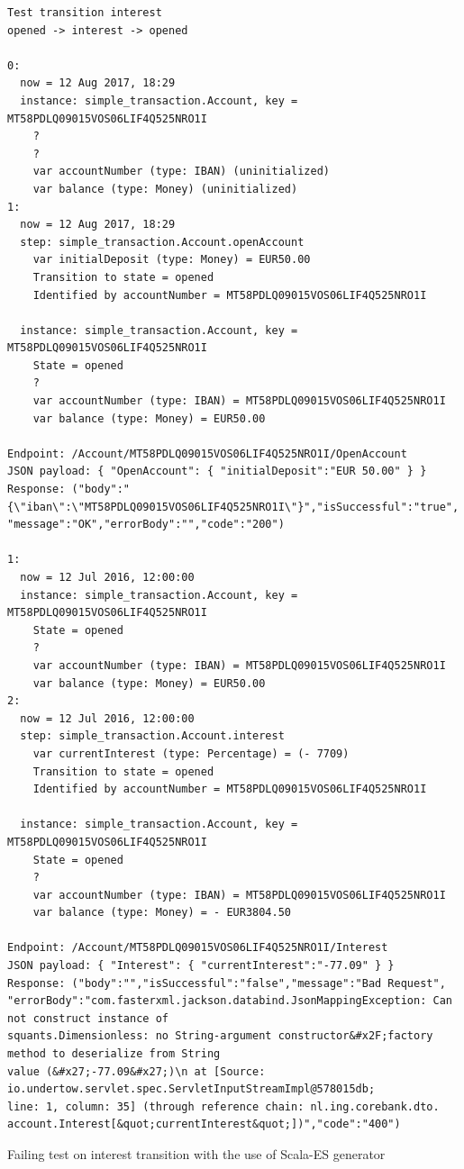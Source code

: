 \begin{sourcecode}[h!]
\begin{lstlisting}[]
Test transition interest
opened -> interest -> opened

0:
  now = 12 Aug 2017, 18:29
  instance: simple_transaction.Account, key = MT58PDLQ09015VOS06LIF4Q525NRO1I
    ?
    ?
    var accountNumber (type: IBAN) (uninitialized)
    var balance (type: Money) (uninitialized)
1:
  now = 12 Aug 2017, 18:29
  step: simple_transaction.Account.openAccount
    var initialDeposit (type: Money) = EUR50.00
    Transition to state = opened
    Identified by accountNumber = MT58PDLQ09015VOS06LIF4Q525NRO1I

  instance: simple_transaction.Account, key = MT58PDLQ09015VOS06LIF4Q525NRO1I
    State = opened
    ?
    var accountNumber (type: IBAN) = MT58PDLQ09015VOS06LIF4Q525NRO1I
    var balance (type: Money) = EUR50.00

Endpoint: /Account/MT58PDLQ09015VOS06LIF4Q525NRO1I/OpenAccount
JSON payload: { "OpenAccount": { "initialDeposit":"EUR 50.00" } }
Response: ("body":"{\"iban\":\"MT58PDLQ09015VOS06LIF4Q525NRO1I\"}","isSuccessful":"true",
"message":"OK","errorBody":"","code":"200")

1:
  now = 12 Jul 2016, 12:00:00
  instance: simple_transaction.Account, key = MT58PDLQ09015VOS06LIF4Q525NRO1I
    State = opened
    ?
    var accountNumber (type: IBAN) = MT58PDLQ09015VOS06LIF4Q525NRO1I
    var balance (type: Money) = EUR50.00
2:
  now = 12 Jul 2016, 12:00:00
  step: simple_transaction.Account.interest
    var currentInterest (type: Percentage) = (- 7709)
    Transition to state = opened
    Identified by accountNumber = MT58PDLQ09015VOS06LIF4Q525NRO1I

  instance: simple_transaction.Account, key = MT58PDLQ09015VOS06LIF4Q525NRO1I
    State = opened
    ?
    var accountNumber (type: IBAN) = MT58PDLQ09015VOS06LIF4Q525NRO1I
    var balance (type: Money) = - EUR3804.50

Endpoint: /Account/MT58PDLQ09015VOS06LIF4Q525NRO1I/Interest
JSON payload: { "Interest": { "currentInterest":"-77.09" } }
Response: ("body":"","isSuccessful":"false","message":"Bad Request",
"errorBody":"com.fasterxml.jackson.databind.JsonMappingException: Can not construct instance of
squants.Dimensionless: no String-argument constructor&#x2F;factory method to deserialize from String
value (&#x27;-77.09&#x27;)\n at [Source: io.undertow.servlet.spec.ServletInputStreamImpl@578015db;
line: 1, column: 35] (through reference chain: nl.ing.corebank.dto.
account.Interest[&quot;currentInterest&quot;])","code":"400")
\end{lstlisting}
\caption{Failing test on interest transition with the use of Scala-ES generator}\label{fig:result-scalaes-interest}
\end{sourcecode}
\FloatBarrier


